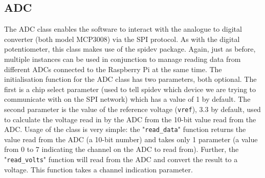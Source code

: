 \documentclass[twoside,a4]{report}
\def\br{\newline \newline \noindent}
\def\rpi{Raspberry Pi }
\begin{document}
	\subsection*{ADC} %
	The ADC class enables the software to interact with the analogue to digital converter (both model MCP3008) via the SPI protocol. As with the digital potentiometer, this class makes use of the spidev package. Again, just as before, multiple instances can be used in conjunction to manage reading data from different ADCs connected to the \rpi at the same time. \br
	The initialisation function for the ADC class has two parameters, both optional. The first is a chip select parameter (used to tell spidev which device we are trying to communicate with on the SPI network) which has a value of 1 by default. The second parameter is the value of the reference voltage (\texttt{vref}), 3.3 by default, used to calculate the voltage read in by the ADC from the 10-bit value read from the ADC. \br
	Usage of the class is very simple: the "\texttt{read\_data}" function returns the value read from the ADC (a 10-bit number) and takes only 1 parameter (a value from 0 to 7 indicating the channel on the ADC to read from). Further, the "\texttt{read\_volts}" function will read from the ADC and convert the result to a voltage. This function takes a channel indication parameter.
	
\end{document}
